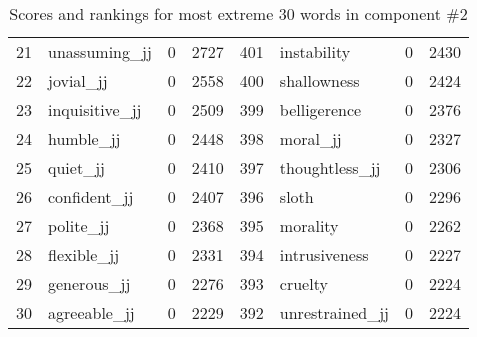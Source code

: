 \begin{table}[tbp]
\begin{tabular}{| rlr@{.}l | rlr@{.}l |}
    21 & unassuming\_jj & 0 & 2727    &    401 & instability & 0 & 2430 \\
    22 & jovial\_jj & 0 & 2558    &    400 & shallowness & 0 & 2424 \\
    23 & inquisitive\_jj & 0 & 2509    &    399 & belligerence & 0 & 2376 \\
    24 & humble\_jj & 0 & 2448    &    398 & moral\_jj & 0 & 2327 \\
    25 & quiet\_jj & 0 & 2410    &    397 & thoughtless\_jj & 0 & 2306 \\
    26 & confident\_jj & 0 & 2407    &    396 & sloth & 0 & 2296 \\
    27 & polite\_jj & 0 & 2368    &    395 & morality & 0 & 2262 \\
    28 & flexible\_jj & 0 & 2331    &    394 & intrusiveness & 0 & 2227 \\
    29 & generous\_jj & 0 & 2276    &    393 & cruelty & 0 & 2224 \\
    30 & agreeable\_jj & 0 & 2229    &    392 & unrestrained\_jj & 0 & 2224 \\
    \hline
    \end{tabular}
    \caption{Scores and rankings for most extreme 30 words in component \#2} 
\end{table}
\clearpage
